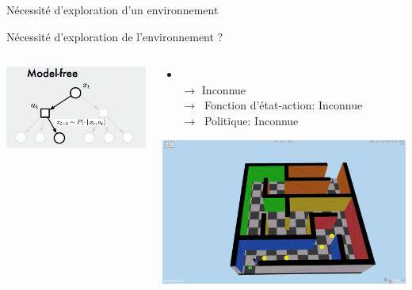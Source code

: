 \begin{frame}{Nécessité d'exploration d'un environnement}

    Nécessité d'exploration de l'environnement ?

\begin{columns}[T] %
\begin{column}{.48\textwidth}
\begin{center}
    \includegraphics[scale=.24]{./curiosity/2}
\end{center}
\end{column}%
\hfill%
\begin{column}{.58\textwidth}
\begin{itemize}
    \item {}\\$\rightarrow$ Inconnue \\ $\rightarrow\:$ Fonction d'état-action: Inconnue \\ $\rightarrow\:$ Politique: Inconnue
\end{itemize}

\bigskip

\begin{center}
    \includegraphics[scale=.1]{./curiosity/4}
\end{center}

\end{column}%
\end{columns}


\end{frame}
